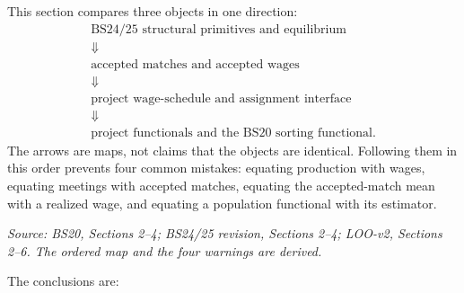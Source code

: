 \documentclass[11pt]{article}
\begin{document}
This section compares three objects in one direction:
\[
\boxed{
\begin{array}{c}
\text{BS24/25 structural primitives and equilibrium}\\
\Downarrow\\
\text{accepted matches and accepted wages}\\
\Downarrow\\
\text{project wage-schedule and assignment interface}\\
\Downarrow\\
\text{project functionals and the BS20 sorting functional}.
\end{array}}
\tag{T3.1}
\]
The arrows are maps, not claims that the objects are identical.  Following
them in this order prevents four common mistakes: equating production with
wages, equating meetings with accepted matches, equating the accepted-match
mean with a realized wage, and equating a population functional with its
estimator.

\textit{Source: BS20, Sections 2--4; BS24/25 revision, Sections 2--4;
LOO-v2, Sections 2--6.  The ordered map and the four warnings are derived.}

The conclusions are:
\end{document}
